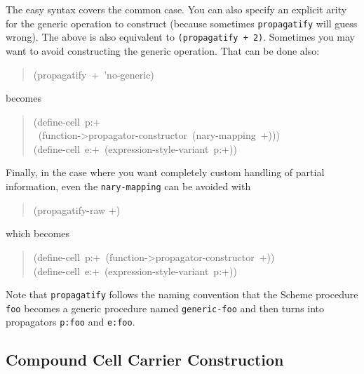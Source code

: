 \documentclass[12pt,letterpaper,english]{article}
\begin{document}
The easy syntax covers the common case.  You can also specify an
explicit arity for the generic operation to construct (because
sometimes \texttt{propagatify} will guess wrong).  The above is also
equivalent to \texttt{(propagatify + 2)}.  Sometimes you may want to avoid
constructing the generic operation.  That can be done also:
\begin{quote}{\ttfamily \raggedright \noindent
(propagatify~+~'no-generic)
}\end{quote}
becomes
\begin{quote}{\ttfamily \raggedright \noindent
(define-cell~p:+~\\
~(function->propagator-constructor~(nary-mapping~+)))~\\
(define-cell~e:+~(expression-style-variant~p:+))
}\end{quote}

Finally, in the case where you want completely custom handling of
partial information, even the \texttt{nary-mapping} can be avoided with
\begin{quote}

(propagatify-raw +)
\end{quote}
which becomes
\begin{quote}{\ttfamily \raggedright \noindent
(define-cell~p:+~(function->propagator-constructor~+))~\\
(define-cell~e:+~(expression-style-variant~p:+))
}\end{quote}

Note that \texttt{propagatify} follows the naming convention that the
Scheme procedure \texttt{foo} becomes a generic procedure named
\texttt{generic-foo} and then turns into propagators \texttt{p:foo} and
\texttt{e:foo}.



\subsection{Compound Cell Carrier Construction}
\label{compound-cell-carrier-construction}
\end{document}
